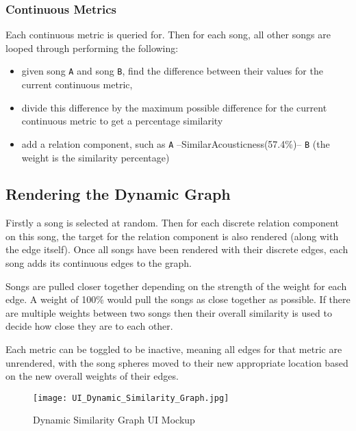 \subsubsection{Continuous Metrics} Each continuous metric is queried for. Then for each song, all other songs are looped through performing the following:\begin{itemize}
    \item given song \texttt{A} and song \texttt{B}, find the difference between their values for the current continuous metric,
    \item divide this difference by the maximum possible difference for the current continuous metric to get a percentage similarity
    \item add a relation component, such as \texttt{A} --SimilarAcousticness(57.4\%)--\> \texttt{B} (the weight is the similarity percentage)
\end{itemize}

\subsection{Rendering the Dynamic Graph}
Firstly a song is selected at random. Then for each discrete relation component on this song, the target for the relation component is also rendered (along with the edge itself). Once all songs have been rendered with their discrete edges, each song adds its continuous edges to the graph.

Songs are pulled closer together depending on the strength of the weight for each edge. A weight of 100\% would pull the songs as close together as possible. If there are multiple weights between two songs then their overall similarity is used to decide how close they are to each other.

Each metric can be toggled to be inactive, meaning all edges for that metric are unrendered, with the song spheres moved to their new appropriate location based on the new overall weights of their edges.

\begin{figure}[h]
    \texttt{[image: UI\_Dynamic\_Similarity\_Graph.jpg]}
    \caption{Dynamic Similarity Graph UI Mockup}
    \label{}
\end{figure}
\pagebreak


